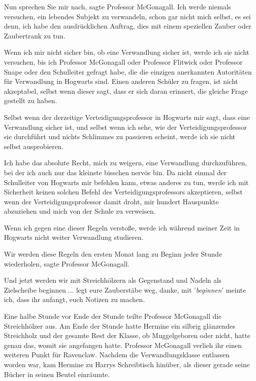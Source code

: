 \glqq{}Nun sprechen Sie mir nach\grqq{}, sagte Professor McGonagall. \glqq{}Ich
werde niemals versuchen, ein lebendes Subjekt zu verwandeln, schon gar nicht
mich selbst, es sei denn, ich habe den ausdrücklichen Auftrag, dies mit einem
speziellen Zauber oder Zaubertrank zu tun.\grqq{}

\glqq{}Wenn ich mir nicht sicher bin, ob eine Verwandlung sicher ist, werde ich
sie nicht versuchen, bis ich Professor McGonagall oder Professor Flitwick oder
Professor Snape oder den Schulleiter gefragt habe, die die einzigen anerkannten
Autoritäten für Verwandlung in Hogwarts sind. Einen anderen Schüler zu fragen,
ist nicht akzeptabel, selbst wenn dieser sagt, dass er sich daran erinnert, die
gleiche Frage gestellt zu haben.\grqq{}

\glqq{}Selbst wenn der derzeitige Verteidigungsprofessor in Hogwarts mir sagt,
dass eine Verwandlung sicher ist, und selbst wenn ich sehe, wie der
Verteidigungsprofessor sie durchführt und nichts Schlimmes zu passieren scheint,
werde ich sie nicht selbst ausprobieren.\grqq{}

\glqq{}Ich habe das absolute Recht, mich zu weigern, eine Verwandlung
durchzuführen, bei der ich auch nur das kleinste bisschen nervös bin. Da nicht
einmal der Schulleiter von Hogwarts mir befehlen kann, etwas anderes zu tun,
werde ich mit Sicherheit keinen solchen Befehl des Verteidigungsprofessors
akzeptieren, selbst wenn der Verteidigungsprofessor damit droht, mir hundert
Hauspunkte abzuziehen und mich von der Schule zu verweisen.\grqq{}

\glqq{}Wenn ich gegen eine dieser Regeln verstoße, werde ich während meiner Zeit
in Hogwarts nicht weiter Verwandlung studieren.\grqq{}

\glqq{}Wir werden diese Regeln den ersten Monat lang zu Beginn jeder Stunde
wiederholen\grqq{}, sagte Professor McGonagall.

\glqq{}Und jetzt werden wir mit Streichhölzern als Gegenstand und Nadeln als
Zielscheibe beginnen ... legt eure Zauberstäbe weg, danke, mit '\emph{beginnen}'
meinte ich, dass ihr anfangt, euch Notizen zu machen.\grqq{}

Eine halbe Stunde vor Ende der Stunde teilte Professor McGonagall die
Streichhölzer aus. Am Ende der Stunde hatte Hermine ein silbrig glänzendes
Streichholz und der gesamte Rest der Klasse, ob Muggelgeboren oder nicht, hatte
genau das, womit sie angefangen hatte. Professor McGonagall verlieh ihr einen
weiteren Punkt für Ravenclaw. Nachdem die Verwandlungsklasse entlassen worden
war, kam Hermine zu Harrys Schreibtisch hinüber, als dieser gerade seine Bücher
in seinen Beutel einräumte.

